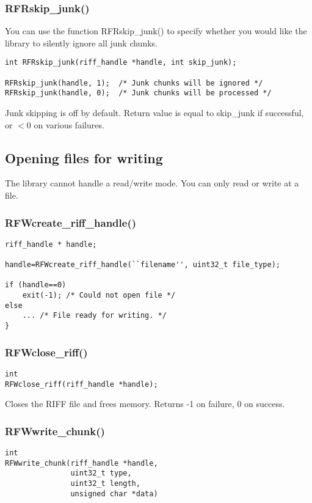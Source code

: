 \documentclass[12pt, a4paper]{article}
\begin{document}
\subsubsection{RFRskip\_junk()}
You can use the function RFRskip\_junk() to
specify whether you would like the library to silently ignore all junk chunks.

\begin{verbatim}
int RFRskip_junk(riff_handle *handle, int skip_junk); 

RFRskip_junk(handle, 1);  /* Junk chunks will be ignored */  
RFRskip_junk(handle, 0);  /* Junk chunks will be processed */
\end{verbatim}

Junk skipping is off by default. Return value is equal to skip\_junk if successful,
or $<0$ on various failures.

\subsection{Opening files for writing}
 The library cannot handle a read/write mode. You can only read or write at
a file.
\subsubsection{RFWcreate\_riff\_handle()}
\begin{verbatim}
riff_handle * handle;

handle=RFWcreate_riff_handle(``filename'', uint32_t file_type);

if (handle==0)
	exit(-1); /* Could not open file */
else
	... /* File ready for writing. */
}
\end{verbatim}

\subsubsection{RFWclose\_riff()}
\begin{verbatim}
int
RFWclose_riff(riff_handle *handle);
\end{verbatim}
Closes the RIFF file and frees memory.
Returns -1 on failure, 0 on success. 

\subsubsection{RFWwrite\_chunk()}
\begin{verbatim}
int
RFWwrite_chunk(riff_handle *handle, 
               uint32_t type, 
               uint32_t length, 
               unsigned char *data)
\end{verbatim}
\end{document}
